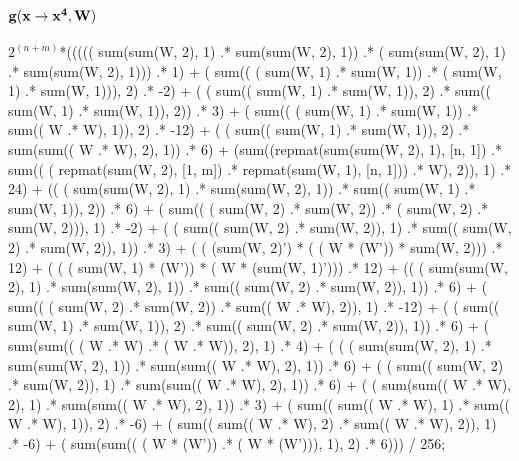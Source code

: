 \documentclass{article}
\begin{document}
\subsection{{$\bf g(x \rightarrow x^4, W)$}}
             $2^{(n+m)}$*((((( sum(sum(W, 2), 1) .* sum(sum(W, 2), 1))  .* ( sum(sum(W, 2), 1) .* sum(sum(W, 2), 1)))  .* 1)  
              + ( sum(( ( sum(W, 1) .* sum(W, 1)) .* ( sum(W, 1) .* sum(W, 1))), 2) .* -2)  
              + ( ( sum(( sum(W, 1) .* sum(W, 1)), 2) .* sum(( sum(W, 1) .* sum(W, 1)), 2)) .* 3)  
              + ( sum(( ( sum(W, 1) .* sum(W, 1)) .* sum(( W .* W), 1)), 2) .* -12)  
              + ( ( sum(( sum(W, 1) .* sum(W, 1)), 2) .* sum(sum(( W .* W), 2), 1)) .* 6)  
              + (sum((repmat(sum(sum(W, 2), 1), [n, 1])  .* sum(( ( repmat(sum(W, 2), [1, m]) .* repmat(sum(W, 1), [n, 1])) .* W), 2)), 1)  .* 24)  
              + (( ( sum(sum(W, 2), 1) .* sum(sum(W, 2), 1)) .* sum(( sum(W, 1) .* sum(W, 1)), 2))  .* 6)  
              + ( sum(( ( sum(W, 2) .* sum(W, 2)) .* ( sum(W, 2) .* sum(W, 2))), 1) .* -2)  
              + ( ( sum(( sum(W, 2) .* sum(W, 2)), 1) .* sum(( sum(W, 2) .* sum(W, 2)), 1)) .* 3)  
              + ( ( (sum(W, 2)') * ( ( W * (W')) * sum(W, 2))) .* 12)  
              + ( ( ( sum(W, 1) * (W')) * ( W * (sum(W, 1)'))) .* 12)  
              + (( ( sum(sum(W, 2), 1) .* sum(sum(W, 2), 1)) .* sum(( sum(W, 2) .* sum(W, 2)), 1))  .* 6)  
              + ( sum(( ( sum(W, 2) .* sum(W, 2)) .* sum(( W .* W), 2)), 1) .* -12)  
              + ( ( sum(( sum(W, 1) .* sum(W, 1)), 2) .* sum(( sum(W, 2) .* sum(W, 2)), 1)) .* 6)  
              + ( sum(sum(( ( W .* W) .* ( W .* W)), 2), 1) .* 4)  
              + ( ( ( sum(sum(W, 2), 1) .* sum(sum(W, 2), 1)) .* sum(sum(( W .* W), 2), 1)) .* 6)  
              + ( ( sum(( sum(W, 2) .* sum(W, 2)), 1) .* sum(sum(( W .* W), 2), 1)) .* 6)  
              + ( ( sum(sum(( W .* W), 2), 1) .* sum(sum(( W .* W), 2), 1)) .* 3)  
              + ( sum(( sum(( W .* W), 1) .* sum(( W .* W), 1)), 2) .* -6)  
              + ( sum(( sum(( W .* W), 2) .* sum(( W .* W), 2)), 1) .* -6)   
              + ( sum(sum(( ( W * (W')) .* ( W * (W'))), 1), 2) .* 6))) / 256;
\end{document}
